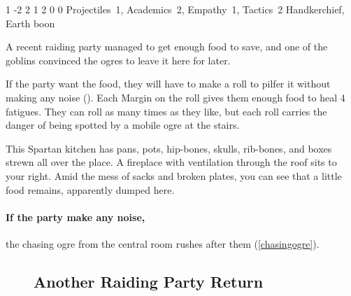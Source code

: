\begin{multicols}{2}



{1}%
{-2}%
{{2}%
{1}%
{2}}%
{0}%
{0}%
{Projectiles~1, Academics~2, Empathy~1, Tactics~2}%
{Handkerchief, Earth \gls{boon}}%
{
  \setcounter{Fate}{2}
  \setcounter{Water}{3}
  \setcounter{Earth}{1}
  \setcounter{fp}{3}
}


\begin{exampletext}
  A recent raiding party managed to get enough food to save, and one of the goblins convinced the ogres to leave it here for later.
\end{exampletext}

If the party want the food, they will have to make a  roll to pilfer it without making any noise (\tn[8]).
Each Margin on the roll gives them enough food to heal 4 \glspl{fatigue}.
They can roll as many times as they like, but each roll carries the danger of being spotted by a mobile ogre at the stairs.

\begin{boxtext}
  This Spartan kitchen has pans, pots, hip-bones, skulls, rib-bones, and boxes strewn all over the place.
  A fireplace with ventilation through the roof sits to your right.
  Amid the mess of sacks and broken plates, you can see that a little food remains, apparently dumped here.
\end{boxtext}

\paragraph{If the party make any noise,}
the chasing ogre from the central room rushes after them (\vref{chasingogre}).

\begin{figure*}[b!]

\setcounter{enc}{\value{list}}
\subsection{Another Raiding Party Return}
\setcounter{list}{\value{enc}}

\begin{multicols}{2}
\setlength\parindent{24pt}


\end{multicols}
\end{figure*}
\end{multicols}
